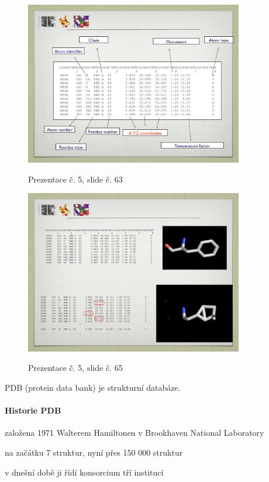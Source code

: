 \documentclass[DIV=8]{scrreprt}
\begin{document}
\begin{figure}
    \caption{Prezentace č. 5, slide č. 63}
    \includegraphics[width=0.85\textwidth]{slides-5/slide-63.jpg}
    \centering
    \label{slides-5-slide-63}
\end{figure}
\begin{figure}
    \caption{Prezentace č. 5, slide č. 65}
    \includegraphics[width=0.85\textwidth]{slides-5/slide-65.jpg}
    \centering
    \label{slides-5-slide-65}
\end{figure}


PDB (protein data bank) je strukturní databáze.

\paragraph{Historie PDB}
\begin{myItemize}[nosep]
    \item založena 1971 Walterem Hamiltonen v Brookhaven National Laboratory
    \item na začátku 7 struktur, nyní přes 150 000 struktur
    \item v dnešní době ji řídí konsorcium tří institucí
\end{myItemize}
\end{document}
